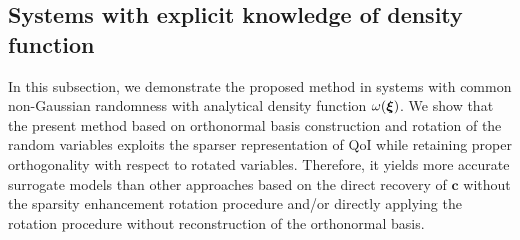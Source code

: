 
\subsection{Systems with explicit knowledge of density function}
\label{sec:explicit_density}
In this subsection, we demonstrate the proposed method in systems with common non-Gaussian 
randomness with analytical density function $\omega(\bm\xi)$. We show that the present method 
based on orthonormal basis construction and rotation of the random variables exploits 
the sparser representation of QoI while retaining proper orthogonality with respect 
to rotated variables. Therefore, it yields more accurate surrogate models than other approaches
based on the direct recovery of $\bm c$ without the sparsity enhancement rotation procedure 
and/or directly applying the rotation procedure without reconstruction of
the orthonormal  basis.

